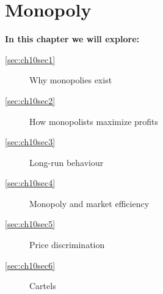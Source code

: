 \chapter{Monopoly} \label{chap:monopoly}

\begin{topics}
\textbf{In this chapter we will explore:}
\begin{description}
\item[\ref{sec:ch10sec1}] Why monopolies exist
\item[\ref{sec:ch10sec2}] How monopolists maximize profits
\item[\ref{sec:ch10sec3}] Long-run behaviour
\item[\ref{sec:ch10sec4}] Monopoly and market efficiency
\item[\ref{sec:ch10sec5}] Price discrimination
\item[\ref{sec:ch10sec6}] Cartels
\end{description}
\end{topics}
